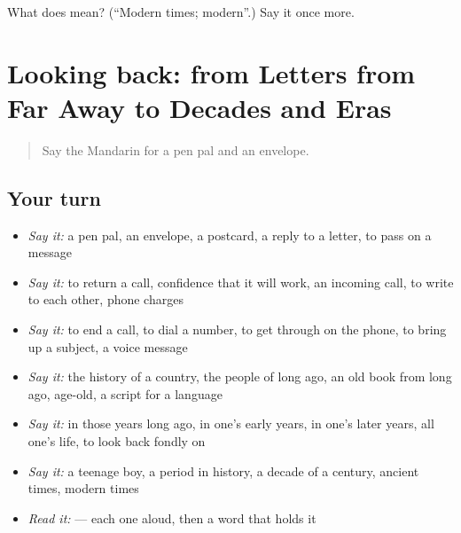 \begin{tcolorbox}[breakable,colback=teal!4,colframe=teal!35!black,title={Before you move on}]
What does  mean? (\textquotedblleft{}Modern times; modern\textquotedblright{}.) Say it once more.
\end{tcolorbox}
\section[(dialogue)]{Looking back: from Letters from Far Away to Decades and Eras}

\label{lesson:ZH-R323-review-318-323}



\begin{quote}
Say the Mandarin for a pen pal and an envelope.
\end{quote}

\subsection*{Your turn}
\begin{itemize}
\raggedright
  \item \emph{Say it:} a pen pal, an envelope, a postcard, a reply to a letter, to pass on a message
  \item \emph{Say it:} to return a call, confidence that it will work, an incoming call, to write to each other, phone charges
  \item \emph{Say it:} to end a call, to dial a number, to get through on the phone, to bring up a subject, a voice message
  \item \emph{Say it:} the history of a country, the people of long ago, an old book from long ago, age-old, a script for a language
  \item \emph{Say it:} in those years long ago, in one's early years, in one's later years, all one's life, to look back fondly on
  \item \emph{Say it:} a teenage boy, a period in history, a decade of a century, ancient times, modern times
  \item \emph{Read it:}    — each one aloud, then a word that holds it
\end{itemize}

